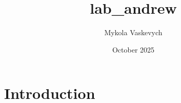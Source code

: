 \documentclass{article}
\title{lab_andrew}
\author{Mykola Vaskevych}
\date{October 2025}
\begin{document}
\maketitle

\section{Introduction}
\end{document}
